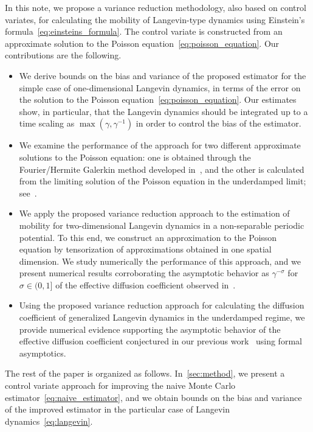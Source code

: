 \documentclass[11pt,a4paper]{article}
\theoremstyle{plain}
\numberwithin{equation}{section}
\begin{document}
In this note,
we propose a variance reduction methodology, also based on control variates,
for calculating the mobility of Langevin-type dynamics using Einstein's formula~\eqref{eq:einsteins_formula}.
The control variate is constructed from an approximate solution to the Poisson equation~\eqref{eq:poisson_equation}.
Our contributions are the following.
\begin{itemize}
    \item
        We derive bounds on the bias and variance of the proposed estimator for the simple case of one-dimensional Langevin dynamics,
        in terms of the error on the solution to the Poisson equation~\eqref{eq:poisson_equation}.
        Our estimates show, in particular, that the Langevin dynamics should be integrated up to a time scaling as $\max(\gamma, \gamma^{-1})$ in order to control the bias of the estimator.
    \item
        We examine the performance of the approach for two different approximate solutions to the Poisson equation:
        one is obtained through the Fourier/Hermite Galerkin method developed in~\cite{roussel2018spectral},
        and the other is calculated from the limiting solution of the Poisson equation in the underdamped limit;
        see~\cite{MR2427108}.
    \item
        We apply the proposed variance reduction approach to the estimation of mobility for two-dimensional Langevin dynamics in a non-separable periodic potential.
        To this end, we construct an approximation to the Poisson equation by tensorization of approximations obtained in one spatial dimension.
        We study numerically the performance of this approach,
        and we present numerical results corroborating the asymptotic behavior as $\gamma^{-\sigma}$ for $\sigma \in (0, 1]$ of the effective diffusion coefficient
        observed in~\cite{roussel_thesis}.
    \item
        Using the proposed variance reduction approach
        for calculating the diffusion coefficient of generalized Langevin dynamics in the underdamped regime,
        we provide numerical evidence supporting the asymptotic behavior of the effective diffusion coefficient conjectured in our previous work~\cite{GPGSUV21} using formal asymptotics.
\end{itemize}
The rest of the paper is organized as follows.
In~\cref{sec:method},
we present a control variate approach for improving the naive Monte Carlo estimator~\eqref{eq:naive_estimator},
and we obtain bounds on the bias and variance of the improved estimator in the particular case of Langevin dynamics~\eqref{eq:langevin}.
\end{document}
